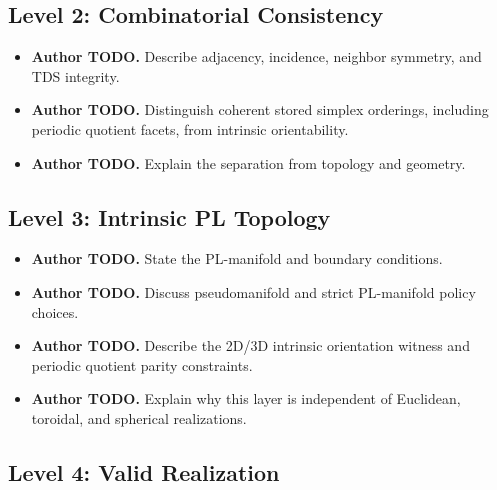 \documentclass[manuscript,nonacm]{acmart}
\newcommand{\AuthorTodo}[1]{\textbf{Author TODO.} #1}
\begin{document}
\subsection{Level 2: Combinatorial Consistency}

\begin{itemize}
  \item \AuthorTodo{Describe adjacency, incidence, neighbor symmetry, and TDS
    integrity.}
  \item \AuthorTodo{Distinguish coherent stored simplex orderings, including
    periodic quotient facets, from intrinsic orientability.}
  \item \AuthorTodo{Explain the separation from topology and geometry.}
\end{itemize}

\subsection{Level 3: Intrinsic PL Topology}

\begin{itemize}
  \item \AuthorTodo{State the PL-manifold and boundary conditions.}
  \item \AuthorTodo{Discuss pseudomanifold and strict PL-manifold policy
    choices.}
  \item \AuthorTodo{Describe the 2D/3D intrinsic orientation witness and
    periodic quotient parity constraints.}
  \item \AuthorTodo{Explain why this layer is independent of Euclidean,
    toroidal, and spherical realizations.}
\end{itemize}

\subsection{Level 4: Valid Realization}
\end{document}
